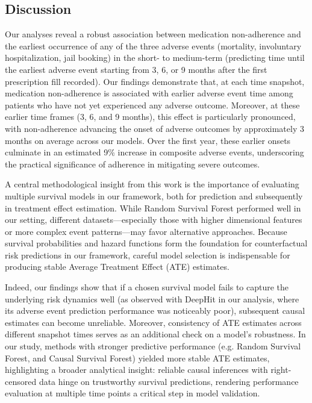 \subsection{Discussion}
\label{ch03:sec:discussion}
Our analyses reveal a robust association between medication non-adherence and the earliest occurrence of any of the three adverse events (mortality, involuntary hospitalization, jail booking) in the short- to medium-term (predicting time until the earliest adverse event starting from 3, 6, or 9 months after the first prescription fill recorded).
Our findings demonstrate that, at each time snapshot, medication non-adherence is associated with earlier adverse event time among patients who have not yet experienced any adverse outcome.
Moreover, at these earlier time frames (3, 6, and 9 months), this effect is particularly pronounced, with non-adherence advancing the onset of adverse outcomes by approximately 3 months on average across our models.
Over the first year, these earlier onsets culminate in an estimated 9\% increase in composite adverse events, underscoring the practical significance of adherence in mitigating severe outcomes.


A central methodological insight from this work is the importance of evaluating multiple survival models in our framework, both for prediction and subsequently in treatment effect estimation.
While Random Survival Forest performed well in our setting, different datasets---especially those with higher dimensional features or more complex event patterns---may favor alternative approaches.
Because survival probabilities and hazard functions form the foundation for counterfactual risk predictions in our framework, careful model selection is indispensable for producing stable Average Treatment Effect (ATE) estimates.

Indeed, our findings show that if a chosen survival model fails to capture the underlying risk dynamics well (as observed with DeepHit in our analysis, where its adverse event prediction performance was noticeably poor), subsequent causal estimates can become unreliable.
Moreover, consistency of ATE estimates across different snapshot times serves as an additional check on a model’s robustness.
In our study, methods with stronger predictive performance (e.g. Random Survival Forest, and Causal Survival Forest) yielded more stable ATE estimates, highlighting a broader analytical insight: reliable causal inferences with right-censored data hinge on trustworthy survival predictions, rendering performance evaluation at multiple time points a critical step in model validation.


